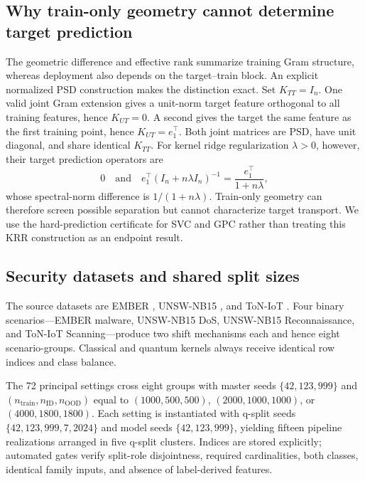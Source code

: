 \documentclass[referee,lineno,pdflatex,sn-nature]{sn-jnl}
\theoremstyle{thmstyleone}%
\theoremstyle{thmstyletwo}%
\theoremstyle{thmstylethree}%
\begin{document}
\subsection{Why train-only geometry cannot determine target prediction}
\label{sec:methods_transport}

The geometric difference and effective rank summarize training Gram structure, whereas deployment also depends on the target--train block. An explicit normalized PSD construction makes the distinction exact. Set $K_{TT}=I_n$. One valid joint Gram extension gives a unit-norm target feature orthogonal to all training features, hence $K_{UT}=0$. A second gives the target the same feature as the first training point, hence $K_{UT}=e_1^\top$. Both joint matrices are PSD, have unit diagonal, and share identical $K_{TT}$. For kernel ridge regularization $\lambda>0$, however, their target prediction operators are
\[
0
\quad\text{and}\quad
e_1^\top(I_n+n\lambda I_n)^{-1}
=\frac{e_1^\top}{1+n\lambda},
\]
whose spectral-norm difference is $1/(1+n\lambda)$. Train-only geometry can therefore screen possible separation but cannot characterize target transport. We use the hard-prediction certificate for SVC and GPC rather than treating this KRR construction as an endpoint result.

\subsection{Security datasets and shared split sizes}

The source datasets are EMBER \cite{anderson2018ember}, UNSW-NB15 \cite{moustafa2015unsw}, and ToN-IoT \cite{alsaedi2020toniot}. Four binary scenarios---EMBER malware, UNSW-NB15 DoS, UNSW-NB15 Reconnaissance, and ToN-IoT Scanning---produce two shift mechanisms each and hence eight scenario-groups. Classical and quantum kernels always receive identical row indices and class balance.

The 72 principal settings cross eight groups with master seeds $\{42,123,999\}$ and $(n_{\mathrm{train}},n_{\mathrm{ID}},n_{\mathrm{OOD}})$ equal to $(1000,500,500)$, $(2000,1000,1000)$, or $(4000,1800,1800)$. Each setting is instantiated with q-split seeds $\{42,123,999,7,2024\}$ and model seeds $\{42,123,999\}$, yielding fifteen pipeline realizations arranged in five q-split clusters. Indices are stored explicitly; automated gates verify split-role disjointness, required cardinalities, both classes, identical family inputs, and absence of label-derived features.
\end{document}
